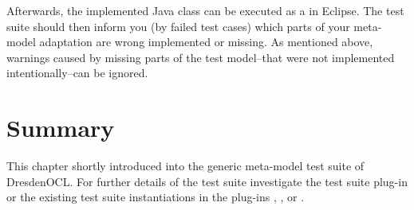 Afterwards, the implemented Java class can be executed as a  in Eclipse. The test suite should then inform you (by failed test 
cases) which parts of your meta-model adaptation are wrong implemented or
missing. As mentioned above, warnings caused by missing parts of the test 
model--that were not implemented intentionally--can be ignored.


\section{Summary}

This chapter shortly introduced into the generic meta-model test suite of 
DresdenOCL. For further details of the test suite investigate the test suite
plug-in
 or
the existing test suite instantiations in the plug-ins , 
, or 
.
